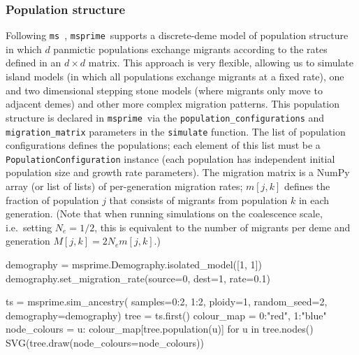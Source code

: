 \documentclass[graybox]{svmult}
\newcommand{\msprime}[0]{\texttt{msprime}}
\newcommand{\ms}[0]{\texttt{ms}}
\begin{document}
\subsubsection{Population structure}\label{population-structure}

Following \ms~\citep{hudson2002generating}, \msprime\ supports a
discrete-deme model of population structure in which
\(d\) panmictic populations exchange migrants according to the rates
defined in an \(d \times d\) matrix. This approach is very flexible,
allowing us to simulate island models (in which all populations exchange
migrants at a fixed rate), one and two dimensional stepping stone models
(where migrants only move to adjacent demes) and other more complex
migration patterns. This population structure is declared in \msprime\ via the
\texttt{population\_configurations} and \texttt{migration\_matrix}
parameters in the \texttt{simulate} function. The list of population
configurations defines the populations; each element of this list must
be a \texttt{PopulationConfiguration} instance (each population has
independent initial population size and growth rate parameters). The
migration matrix is a NumPy array (or list of lists) of per-generation
migration rates; \(m[j,k]\) defines the fraction of population \(j\)
that consists of migrants from population \(k\) in each generation. (Note that when running simulations on the coalescence scale, i.e.\ setting \(N_e=1/2\), this is equivalent to the number of migrants per deme and generation \(M[j,k]=2 N_e m[j,k]\).)

\begin{pythoncode}
demography =  msprime.Demography.isolated_model([1, 1])
demography.set_migration_rate(source=0, dest=1, rate=0.1)

ts  = msprime.sim_ancestry(
    samples={0:2, 1:2}, ploidy=1,
    random_seed=2, demography=demography)
tree = ts.first()
colour_map = {0:"red", 1:"blue"}
node_colours = {u: colour_map[tree.population(u)] for u in tree.nodes()}
SVG(tree.draw(node_colours=node_colours))
\end{pythoncode}
\end{document}
